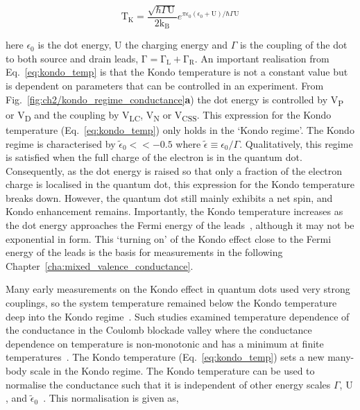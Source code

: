 \begin{equation}\label{eq:kondo_temp}
 \mathrm{T_K} = 
 \frac{\sqrt{\hbar\Gamma \mathrm{U}}}{2\mathrm{k_B}}
 e^{\pi \epsilon_0 (\epsilon_0 + \mathrm{U})/\hbar\Gamma\mathrm{U}}
\end{equation}

 \noindent here $\epsilon_0$ is the dot energy, $\mathrm{U}$ the charging energy and $\Gamma$ is the coupling of the dot to both source and drain leads, $\mathrm{\Gamma = \Gamma_L + \Gamma_R}$. 
 An important realisation from Eq.~\ref{eq:kondo_temp} is that the Kondo temperature is not a constant value but is dependent on parameters that can be controlled in an experiment. 
 From Fig.~\ref{fig:ch2/kondo_regime_conductance}\textbf{a}) the dot energy is controlled by V\textsubscript{P} or V\textsubscript{D} and the coupling by V\textsubscript{LC}, V\textsubscript{N} or V\textsubscript{CSS}.
This expression for the Kondo temperature (Eq.~\ref{eq:kondo_temp}) only holds in the `Kondo regime'. The Kondo regime is characterised by $\tilde{\epsilon}_0<<-0.5$ where $\tilde{\epsilon}\equiv \epsilon_0/\Gamma$. Qualitatively, this regime is satisfied when the full charge of the electron is in the quantum dot. Consequently, as the dot energy is raised so that only a fraction of the electron charge is localised in the quantum dot, this expression for the Kondo temperature breaks down. However, the quantum dot still mainly exhibits a net spin, and Kondo enhancement remains. Importantly, the Kondo temperature increases as the dot energy approaches the Fermi energy of the leads~\cite{goldhaber_mv}, although it may not be exponential in form. This `turning on' of the Kondo effect close to the Fermi energy of the leads is the basis for measurements in the following Chapter~\ref{cha:mixed_valence_conductance}.
 

Many early measurements on the Kondo effect in quantum dots used very strong couplings, so the system temperature remained below the Kondo temperature deep into the Kondo regime~\cite{kondo_unitary}. Such studies examined temperature dependence of the conductance in the Coulomb blockade valley where the conductance dependence on temperature is non-monotonic and has a minimum at finite temperatures~\cite{Pustilnik2004}. The Kondo temperature (Eq.~\ref{eq:kondo_temp}) sets a new many-body scale in the Kondo regime. The Kondo temperature can be used to normalise the conductance such that it is independent of other energy scales $\Gamma$, $\mathrm{U}$, and $\tilde{\epsilon}_0$~\cite{costi_kondo_mv_eo_regime}. This normalisation is given as, 

